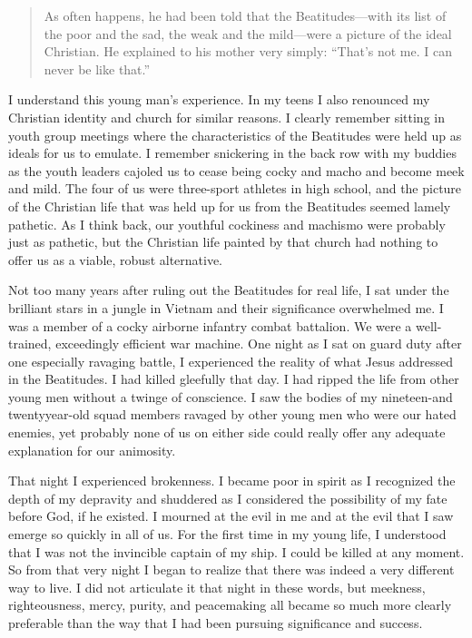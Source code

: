 				\begin{quote}
					As often happens, he had been told that the Beatitudes---with its list of the poor and the sad, the weak and the mild---were a picture of the ideal Christian. He explained to his mother very simply: ``That's not me. I can never be like that.'' 
				\end{quote}

			I understand this young man's experience. In my teens I also renounced my Christian identity and church for similar reasons. I clearly remember sitting in youth group meetings where the characteristics of the Beatitudes were held up as ideals for us to emulate. I remember snickering in the back row with my buddies as the youth leaders cajoled us to cease being cocky and macho and become meek and mild. The four of us were three-sport athletes in high school, and the picture of the Christian life that was held up for us from the Beatitudes seemed lamely pathetic. As I think back, our youthful cockiness and machismo were probably just as pathetic, but the Christian life painted by that church had nothing to offer us as a viable, robust alternative. 

			Not too many years after ruling out the Beatitudes for real life, I sat under the brilliant stars in a jungle in Vietnam and their significance overwhelmed me. I was a member of a cocky airborne infantry combat battalion. We were a well-trained, exceedingly efficient war machine. One night as I sat on guard duty after one especially ravaging battle, I experienced the reality of what Jesus addressed in the Beatitudes. I had killed gleefully that day. I had ripped the life from other young men without a twinge of conscience. I saw the bodies of my nineteen-and twentyyear-old squad members ravaged by other young men who were our hated enemies, yet probably none of us on either side could really offer any adequate explanation for our animosity. 

			That night I experienced brokenness. I became poor in spirit as I recognized the depth of my depravity and shuddered as I considered the possibility of my fate before God, if he existed. I mourned at the evil in me and at the evil that I saw emerge so quickly in all of us. For the first time in my young life, I understood that I was not the invincible captain of my ship. I could be killed at any moment. So from that very night I began to realize that there was indeed a very different way to live. I did not articulate it that night in these words, but meekness, righteousness, mercy, purity, and peacemaking all became so much more clearly preferable than the way that I had been pursuing significance and success. 

